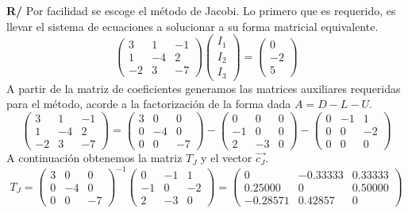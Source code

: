 \documentclass[12pt]{article}
\begin{document}
\begin{enumerate}[leftmargin=*,widest=9]
{\begin{enumerate}[label=\alph*]
\textbf{R/} Por facilidad se escoge el método de Jacobi. Lo primero que es requerido, es llevar el sistema de ecuaciones a solucionar a su forma matricial equivalente.
   \[
\begin{pmatrix} 3 & 1 & -1\\ 1 & -4 & 2\\ -2 & 3 & -7 \end{pmatrix}
\begin{pmatrix} I_1 \\ I_2 \\ I_3 \end{pmatrix} = \begin{pmatrix} 0 \\ -2 \\ 5 \end{pmatrix}
   \]
   A partir de la matriz de coeficientes generamos las matrices auxiliares requeridas para el método, acorde a la factorización de la forma dada \(A = D - L - U\).
   \[
\begin{pmatrix} 3 & 1 & -1\\ 1 & -4 & 2\\ -2 & 3 & -7 \end{pmatrix} = \begin{pmatrix} 3 & 0 & 0\\ 0 & -4 & 0\\ 0 & 0 & -7 \end{pmatrix} -
\begin{pmatrix} 0 & 0 & 0\\ -1 & 0 & 0\\ 2 & -3 & 0 \end{pmatrix} - \begin{pmatrix} 0 & -1 & 1\\ 0 & 0 & -2\\ 0 & 0 & 0 \end{pmatrix}
   \]
   A continuación obtenemos la matriz \(T_J\) y el vector \(\vec{c_J}\).
   \[
T_J = \begin{pmatrix} 3 & 0 & 0\\ 0 & -4 & 0\\ 0 & 0 & -7 \end{pmatrix}^{-1}\begin{pmatrix} 0 & -1 & 1\\ -1 & 0 & -2\\ 2 & -3 & 0 \end{pmatrix} =
\begin{pmatrix}0 & -0.33333 & 0.33333\\ 0.25000 & 0 & 0.50000\\ -0.28571 & 0.42857 & 0 \end{pmatrix}
\]
\end{enumerate}}
\end{enumerate}
\end{document}
